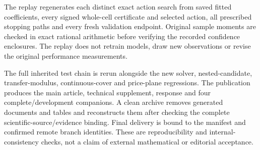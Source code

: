 \documentclass[ecta,nameyear,draft]{econsocart}
\begin{document}
The replay regenerates each distinct exact action search from saved
fitted coefficients, every signed whole-cell certificate and selected
action, all prescribed stopping paths and every fresh validation
endpoint. Original sample moments are checked in exact rational
arithmetic before verifying the recorded confidence enclosures. The
replay does not retrain models, draw new observations or revise the
original performance measurements.

The full inherited test chain is rerun alongside the new solver,
nested-candidate, transfer-modulus, continuous-cover and price-plane
regressions. The publication produces the main article, technical
supplement, response and four complete/development companions. A clean
archive removes generated documents and tables and reconstructs them
after checking the complete scientific-source/evidence binding. Final
delivery is bound to the manifest and confirmed remote branch
identities. These are reproducibility and internal-consistency checks,
not a claim of external mathematical or editorial acceptance.
\end{document}
